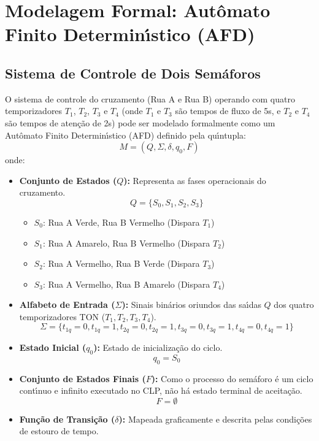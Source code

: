 \documentclass{article}
\begin{document}
\section*{Modelagem Formal: Aut\^omato Finito Determin\'{\i}stico (AFD)}
\subsection*{Sistema de Controle de Dois Sem\'aforos}

O sistema de controle do cruzamento (Rua A e Rua B) operando com quatro temporizadores $T_1$, $T_2$, $T_3$ e $T_4$ (onde $T_1$ e $T_3$ s\~ao tempos de fluxo de 5s, e $T_2$ e $T_4$ s\~ao tempos de aten\c{c}\~ao de 2s) pode ser modelado formalmente como um Aut\^omato Finito Determin\'{\i}stico (AFD) definido pela qu\'{\i}ntupla:
\[
M = (Q, \Sigma, \delta, q_0, F)
\]
onde:

\begin{itemize}
    \item \textbf{Conjunto de Estados ($Q$):} Representa as fases operacionais do cruzamento.
    \[
    Q = \{S_0, S_1, S_2, S_3\}
    \]
    \begin{itemize}
        \item $S_0$: Rua A Verde, Rua B Vermelho (Dispara $T_1$)
        \item $S_1$: Rua A Amarelo, Rua B Vermelho (Dispara $T_2$)
        \item $S_2$: Rua A Vermelho, Rua B Verde (Dispara $T_3$)
        \item $S_3$: Rua A Vermelho, Rua B Amarelo (Dispara $T_4$)
    \end{itemize}

    \item \textbf{Alfabeto de Entrada ($\Sigma$):} Sinais bin\'arios oriundos das sa\'{\i}das $Q$ dos quatro temporizadores TON ($T_1, T_2, T_3, T_4$).
    \[
    \Sigma = \{t_{1q}=0, t_{1q}=1, t_{2q}=0, t_{2q}=1, t_{3q}=0, t_{3q}=1, t_{4q}=0, t_{4q}=1\}
    \]

    \item \textbf{Estado Inicial ($q_0$):} Estado de inicializa\c{c}\~ao do ciclo.
    \[
    q_0 = S_0
    \]

    \item \textbf{Conjunto de Estados Finais ($F$):} Como o processo do sem\'aforo \'e um ciclo cont\'{\i}nuo e infinito executado no CLP, n\~ao h\'a estado terminal de aceita\c{c}\~ao.
    \[
    F = \emptyset
    \]

    \item \textbf{Fun\c{c}\~ao de Transi\c{c}\~ao ($\delta$):} Mapeada graficamente e descrita pelas condi\c{c}\~oes de estouro de tempo.
\end{itemize}
\end{document}

